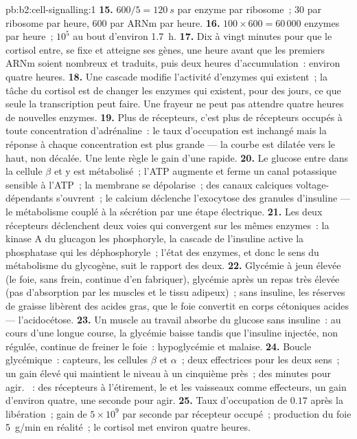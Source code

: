 \begin{solution}{pb:b2:cell-signalling:1}
\textbf{15.} $600/5 = \qty{120}{s}$ par enzyme par ribosome~; 30 par
ribosome par heure, 600 par ARNm par heure.
\textbf{16.} $100\times 600 = 60\,000$ enzymes par heure~; $10^{5}$ au
bout d'environ \qty{1.7}{h}.
\textbf{17.} Dix à vingt minutes pour que le cortisol entre, se fixe et
atteigne ses gènes, une heure avant que les premiers ARNm soient
nombreux et traduits, puis deux heures d'accumulation~: environ quatre
heures.
\textbf{18.} Une cascade modifie l'activité d'enzymes qui existent~; la
tâche du cortisol est de changer les enzymes qui existent, pour des
jours, ce que seule la transcription peut faire. Une frayeur ne peut pas
attendre quatre heures de nouvelles enzymes.
\textbf{19.} Plus de récepteurs, c'est plus de récepteurs occupés à
toute concentration d'adrénaline~: le taux d'occupation est inchangé
mais la réponse à chaque concentration est plus grande --- la courbe est
dilatée vers le haut, non décalée. Une  lente règle le gain d'une
 rapide.
\textbf{20.} Le glucose entre dans la cellule $\beta$ et y est
métabolisé~; l'ATP augmente et ferme un canal potassique sensible à
l'ATP~; la membrane se dépolarise~; des canaux calciques
voltage-dépendants s'ouvrent~; le calcium déclenche l'exocytose des
granules d'insuline --- le métabolisme couplé à la sécrétion par une
étape électrique.
\textbf{21.} Les deux récepteurs déclenchent deux voies qui convergent
sur les mêmes enzymes~: la kinase A du glucagon les phosphoryle, la
cascade de l'insuline active la phosphatase qui les déphosphoryle~;
l'état des enzymes, et donc le sens du métabolisme du glycogène, suit le
rapport des deux.
\textbf{22.} Glycémie à jeun élevée (le foie, sans frein, continue d'en
fabriquer), glycémie après un repas très élevée (pas d'absorption par
les muscles et le tissu adipeux)~; sans insuline, les réserves de
graisse libèrent des acides gras, que le foie convertit en corps
cétoniques acides --- l'acidocétose.
\textbf{23.} Un muscle au travail absorbe du glucose sans insuline~: au
cours d'une longue course, la glycémie baisse tandis que l'insuline
injectée, non régulée, continue de freiner le foie~: hypoglycémie et
malaise.
\textbf{24.} Boucle glycémique~: capteurs, les cellules $\beta$ et
$\alpha$~; deux  effectrices pour les deux sens~; un gain élevé
qui maintient le niveau à un cinquième près~; des minutes pour agir.
~: des récepteurs à l'étirement, le  et les vaisseaux
comme effecteurs, un gain d'environ quatre, une seconde pour agir.
\textbf{25.} Taux d'occupation de $0.17$ après la libération~; gain de
$5\times 10^{9}$ par seconde par récepteur occupé~; production du foie
\qty{5}{g/min} en réalité~; le cortisol met environ quatre heures.
\end{solution}
